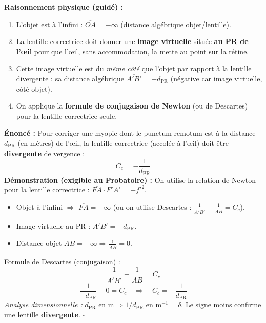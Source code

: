 \documentclass[11pt]{article}
\providecommand{\qed}{\hfill$\square$}
\begin{document}
\textbf{Raisonnement physique (guidé) :}
\begin{enumerate}
    \item L'objet est à l'infini : $\overline{OA} = -\infty$ (distance algébrique objet/lentille).
    \item La lentille correctrice doit donner une \textbf{image virtuelle} située \textbf{au PR de l'œil} pour que l'œil, sans accommodation, la mette au point sur la rétine.
    \item Cette image virtuelle est du \emph{même côté} que l'objet par rapport à la lentille divergente : sa distance algébrique $\overline{A'B'} = -d_{\text{PR}}$ (négative car image virtuelle, côté objet).
    \item On applique la \textbf{formule de conjugaison de Newton} (ou de Descartes) pour la lentille correctrice seule.
\end{enumerate}

\begin{propriete}
\textbf{Énoncé :} Pour corriger une myopie dont le punctum remotum est à la distance $d_{\text{PR}}$ (en mètres) de l'œil, la lentille correctrice (accolée à l'œil) doit être \textbf{divergente} de vergence :
\[
\boxed{C_c = -\dfrac{1}{d_{\text{PR}}}}
\]
\textbf{Démonstration (exigible au Probatoire) :}
On utilise la relation de Newton pour la lentille correctrice : $\overline{FA} \cdot \overline{F'A'} = -f'^2$.
\begin{itemize}
    \item Objet à l'infini $\Rightarrow$ $\overline{FA} = -\infty$ (ou on utilise Descartes : $\frac{1}{\overline{A'B'}} - \frac{1}{\overline{AB}} = C_c$).
    \item Image virtuelle au PR : $\overline{A'B'} = -d_{\text{PR}}$.
    \item Distance objet $\overline{AB} = -\infty \Rightarrow \frac{1}{\overline{AB}} = 0$.
\end{itemize}
Formule de Descartes (conjugaison) :
\[
\frac{1}{\overline{A'B'}} - \frac{1}{\overline{AB}} = C_c
\]
\[
\frac{1}{-d_{\text{PR}}} - 0 = C_c \quad \Rightarrow \quad C_c = -\frac{1}{d_{\text{PR}}}
\]
\emph{Analyse dimensionnelle :} $d_{\text{PR}}$ en $\text{m} \Rightarrow 1/d_{\text{PR}}$ en $\text{m}^{-1} = \delta$. Le signe moins confirme une lentille \textbf{divergente}. \qed
\end{propriete}
\end{document}
